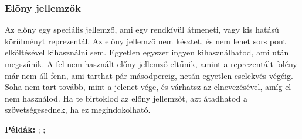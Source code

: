 \subsubsection{Előny jellemzők}

Az előny egy speciális jellemző, ami egy rendkívül átmeneti, vagy kis hatású körülményt reprezentál. Az előny jellemző nem késztet, és nem lehet sors pont elköltésével kihasználni sem. Egyetlen egyszer ingyen kihasználhatod, ami után megszűnik. A fel nem használt előny jellemző eltűnik, amint a reprezentált fölény már nem áll fenn, ami tarthat pár másodpercig, netán egyetlen cselekvés végéig. Soha nem tart tovább, mint a jelenet vége, és várhatsz az elnevezésével, amíg el nem használod. Ha te birtoklod az előny jellemzőt, azt átadhatod a szövetségesednek, ha ez megindokolható.

\textbf{Példák:} ; ; 
